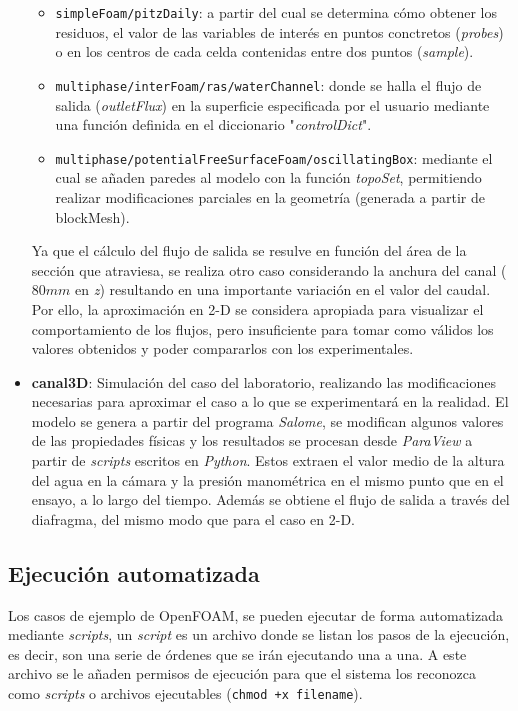 \begin{itemize}
  \begin{itemize}
  \item
    \texttt{simpleFoam/pitzDaily}: a partir del cual se determina cómo
    obtener los residuos, el valor de las variables de interés en puntos
    conctretos (\emph{probes}) o en los centros de cada celda contenidas
    entre dos puntos (\emph{sample}).
  \item
    \texttt{multiphase/interFoam/ras/waterChannel}: donde se halla el
    flujo de salida (\emph{outletFlux}) en la superficie especificada
    por el usuario mediante una función definida en el diccionario
    "\emph{controlDict}".
  \item
    \texttt{multiphase/potentialFreeSurfaceFoam/oscillatingBox}:
    mediante el cual se añaden paredes al modelo con la función
    \emph{topoSet}, permitiendo realizar modificaciones parciales en la
    geometría (generada a partir de blockMesh).
  \end{itemize}

  Ya que el cálculo del flujo de salida se resulve en función del área
  de la sección que atraviesa, se realiza otro caso considerando la
  anchura del canal (\(80 mm\) en \emph{z}) resultando en una importante
  variación en el valor del caudal. Por ello, la aproximación en 2-D se
  considera apropiada para visualizar el comportamiento de los flujos,
  pero insuficiente para tomar como válidos los valores obtenidos y
  poder compararlos con los experimentales. \\
\item
  \textbf{canal3D}: Simulación del caso del laboratorio, realizando las
  modificaciones necesarias para aproximar el caso a lo que se
  experimentará en la realidad. El modelo se genera a partir del
  programa \emph{Salome}, se modifican algunos valores de las
  propiedades físicas y los resultados se procesan desde \emph{ParaView}
  a partir de \emph{scripts} escritos en \emph{Python}. Estos extraen el
  valor medio de la altura del agua en la cámara y la presión
  manométrica en el mismo punto que en el ensayo, a lo largo del tiempo.
  Además se obtiene el flujo de salida a través del diafragma, del mismo
  modo que para el caso en 2-D.
\end{itemize}

\subsection{Ejecución automatizada}\label{header-n52}

Los casos de ejemplo de OpenFOAM, se pueden ejecutar de forma
automatizada mediante \emph{scripts}, un \emph{script} es un archivo
donde se listan los pasos de la ejecución, es decir, son una serie de
órdenes que se irán ejecutando una a una. A este archivo se le añaden
permisos de ejecución para que el sistema los reconozca como
\emph{scripts} o archivos ejecutables (\texttt{chmod\ +x\ filename}).

